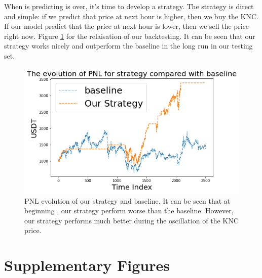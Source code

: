 \documentclass[twoside]{report}
\begin{document}
\begin{spacing}{1}
When is predicting is over, it's time to develop a strategy. The strategy is direct and simple: if we predict that price at next hour is higher, then we buy the KNC. If our model predict that the price at next hour is lower, then we sell the price right now.
Figure \ref{fig:LSTM PNL} for the relaisation of our backtesting. It can be seen that our strategy works nicely and outperform the baseline in the long run in our testing set. 
\begin{figure}[!htbp]
    \centering
    \includegraphics[scale = 0.7]{Images/LSTM PNL.png}
    \caption{PNL evolution of our strategy and baseline. It can be seen that at beginning , our strategy perform worse than the baseline. However, our strategy performs much better during the oscillation of the KNC price. }
    \label{fig:LSTM PNL}
\end{figure}


























\appendix
\chapter{Supplementary Figures}\label{app:supplementary figures}


\end{spacing}
\end{document}
